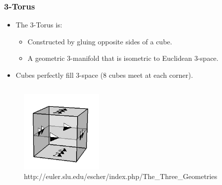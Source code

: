 \documentclass[13pt]{beamer}
\begin{document}
\begin{frame}
\frametitle{3-Torus}
  \begin{itemize}
    \item The \alert{3-Torus} is:
          \begin{itemize}
             \item Constructed by gluing opposite sides of a cube.
             \item A geometric 3-manifold that is isometric to Euclidean 3-space.
           \end{itemize} 
    \item Cubes perfectly fill 3-space (8 cubes meet at each corner).
  \end{itemize}
  \begin{columns}[r] %
     \centering
      \begin{figure}
        \includegraphics[height=4cm]{./img/cubegluing}
        \caption{http://euler.slu.edu/escher/index.php/The\_Three\_Geometries}
      \end{figure}
  \end{columns}
\end{frame}



\end{document}
